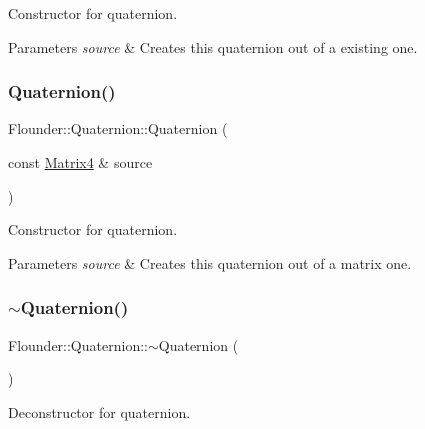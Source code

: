 Constructor for quaternion. 


\begin{DoxyParams}{Parameters}
{\em source} & Creates this quaternion out of a existing one. \\
\hline
\end{DoxyParams}
\mbox{\label{class_flounder_1_1_quaternion_aec0cd32c17e9c2d281d01e2ceaffe965}} 
\subsubsection{\texorpdfstring{Quaternion()}{Quaternion()}\hspace{0.1cm}{\footnotesize\ttfamily [4/4]}}
{\footnotesize\ttfamily Flounder\+::\+Quaternion\+::\+Quaternion (\begin{DoxyParamCaption}\item[{const \hyperlink{class_flounder_1_1_matrix4}{Matrix4} \&}]{source }\end{DoxyParamCaption})}



Constructor for quaternion. 


\begin{DoxyParams}{Parameters}
{\em source} & Creates this quaternion out of a matrix one. \\
\hline
\end{DoxyParams}
\mbox{\label{class_flounder_1_1_quaternion_a99c09ed056e8a055d5b362646b2dc4a7}} 
\subsubsection{\texorpdfstring{$\sim$\+Quaternion()}{~Quaternion()}}
{\footnotesize\ttfamily Flounder\+::\+Quaternion\+::$\sim$\+Quaternion (\begin{DoxyParamCaption}{ }\end{DoxyParamCaption})}



Deconstructor for quaternion. 



